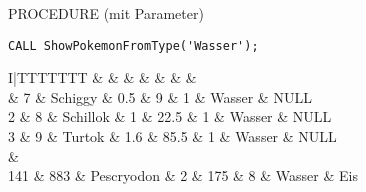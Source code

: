 \begin{sql}{PROCEDURE (mit Parameter)}
    \begin{lstlisting}[language=mysql]
        CALL ShowPokemonFromType('Wasser');
    \end{lstlisting}

    \setcounter{rownum}{0}
    \begin{tabular}{I|TTTTTTT}
        &  &  &  &  &  &  &  \\ & 7 & Schiggy & 0.5 & 9 & 1 & Wasser & NULL \\
        2 & 8 & Schillok & 1 & 22.5 & 1 & Wasser & NULL \\
        3 & 9 & Turtok & 1.6 & 85.5 & 1 & Wasser & NULL \\
         &  \\
        141 & 883 & Pescryodon & 2 & 175 & 8 & Wasser & Eis \\
    \end{tabular}
\end{sql}

